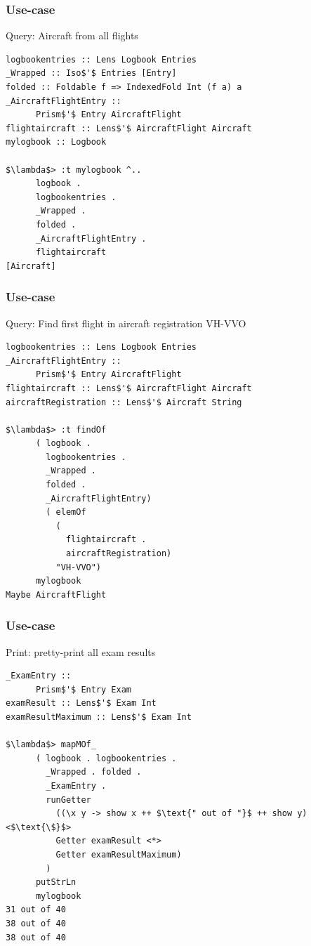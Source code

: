 \begin{frame}[fragile]
\frametitle{Use-case}
\begin{block}{Query: Aircraft from all flights}
\begin{lstlisting}[style=haskell,basicstyle=\scriptsize\ttfamily,mathescape]
logbookentries :: Lens Logbook Entries
_Wrapped :: Iso$'$ Entries [Entry]
folded :: Foldable f => IndexedFold Int (f a) a 
_AircraftFlightEntry ::
      Prism$'$ Entry AircraftFlight
flightaircraft :: Lens$'$ AircraftFlight Aircraft
mylogbook :: Logbook

$\lambda$> :t mylogbook ^..
      logbook .
      logbookentries .
      _Wrapped .
      folded .
      _AircraftFlightEntry .
      flightaircraft
[Aircraft]
\end{lstlisting}
\end{block}
\end{frame}

\begin{frame}[fragile]
\frametitle{Use-case}
\begin{block}{Query: Find first flight in aircraft registration VH-VVO}
\begin{lstlisting}[style=haskell,basicstyle=\scriptsize\ttfamily,mathescape]
logbookentries :: Lens Logbook Entries
_AircraftFlightEntry ::
      Prism$'$ Entry AircraftFlight
flightaircraft :: Lens$'$ AircraftFlight Aircraft
aircraftRegistration :: Lens$'$ Aircraft String

$\lambda$> :t findOf
      ( logbook . 
        logbookentries . 
        _Wrapped . 
        folded . 
        _AircraftFlightEntry)
        ( elemOf
          (
            flightaircraft . 
            aircraftRegistration)
          "VH-VVO")
      mylogbook
Maybe AircraftFlight
\end{lstlisting}
\end{block}
\end{frame}

\begin{frame}[fragile]
\frametitle{Use-case}
\begin{block}{Print: pretty-print all exam results}
\begin{lstlisting}[style=haskell,basicstyle=\scriptsize\ttfamily,mathescape]
_ExamEntry ::
      Prism$'$ Entry Exam
examResult :: Lens$'$ Exam Int
examResultMaximum :: Lens$'$ Exam Int

$\lambda$> mapMOf_
      ( logbook . logbookentries .
        _Wrapped . folded .
        _ExamEntry .
        runGetter
          ((\x y -> show x ++ $\text{" out of "}$ ++ show y) <$\text{\$}$>
          Getter examResult <*>
          Getter examResultMaximum)
        )
      putStrLn
      mylogbook
31 out of 40
38 out of 40
38 out of 40
\end{lstlisting}
\end{block}
\end{frame}

